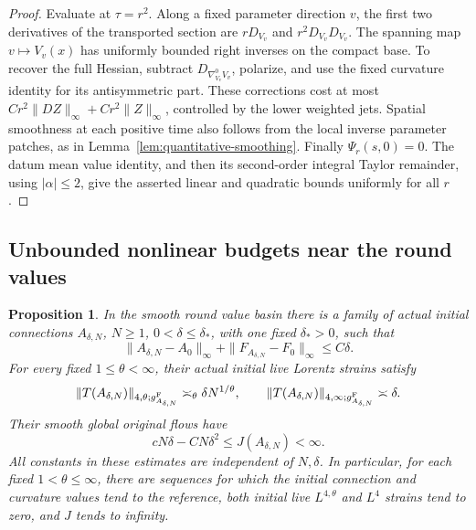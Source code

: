 \documentclass[11pt]{article}
\numberwithin{equation}{section}
\newtheorem{proposition}[theorem]{Proposition}
\theoremstyle{definition}
\theoremstyle{remark}
\begin{document}
\begin{proof}
Evaluate at \(\tau=r^2\). Along a fixed parameter direction
\(v\), the first two derivatives of the transported section
are \(rD_{V_v}\) and \(r^2D_{V_v}D_{V_v}\).
The spanning map \(v\mapsto V_v(x)\) has uniformly bounded
right inverses on the compact base. To recover the full
Hessian, subtract \(D_{\nabla^0_{V_v}V_v}\), polarize, and
use the fixed curvature identity for its antisymmetric
part. These corrections cost at most
\(Cr^2\|DZ\|_\infty+Cr^2\|Z\|_\infty\), controlled by
the lower weighted jets. Spatial smoothness at each
positive time also follows from the local inverse
parameter patches, as in Lemma~\ref{lem:quantitative-smoothing}.
Finally \(\Psi_r(s,0)=0\). The datum mean value identity,
and then its second-order integral Taylor remainder,
using \(|\alpha|\le2\), give the asserted linear and
quadratic bounds uniformly for all \(r\).
\end{proof}

\begin{samepage}
\subsection{Unbounded nonlinear budgets near the round values}
\label{subsec:nonlinear-unbounded-budget}

\begin{proposition}
\label{prop:nonlinear-unbounded-budget}
In the smooth round value basin there is a family of actual
initial connections \(A_{\delta,N}\), \(N\ge1\),
\(0<\delta\le\delta_*\), with one fixed \(\delta_*>0\), such that
\[
 \|A_{\delta,N}-A_0\|_\infty+
 \|F_{A_{\delta,N}}-F_0\|_\infty\le C\delta .
\]
For every fixed \(1\le\theta<\infty\), their actual initial
live Lorentz strains satisfy
\[
 \|T(A_{\delta,N})\|_{4,\theta;g^{\rm F}_{A_{\delta,N}}}
       \asymp_\theta\delta N^{1/\theta},\qquad
 \|T(A_{\delta,N})\|_{4,\infty;g^{\rm F}_{A_{\delta,N}}}
       \asymp\delta .
\]
Their smooth global original flows have
\[
             cN\delta-CN\delta^2\le J(A_{\delta,N})<\infty .
\]
All constants in these estimates are independent of \(N,\delta\).
In particular, for each fixed \(1<\theta\le\infty\), there
are sequences for which the initial connection and curvature
values tend to the reference, both initial live \(L^{4,\theta}\)
and \(L^4\) strains tend to zero, and \(J\) tends to infinity.
\end{proposition}
\end{samepage}
\end{document}
